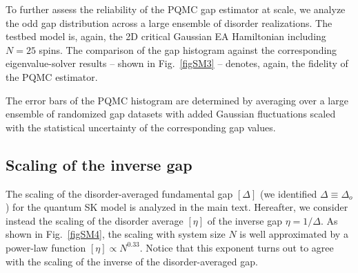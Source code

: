 \documentclass[aps,prl,twocolumn,superscriptaddress,nofootinbib]{revtex4-2}
\begin{document}
To further assess the reliability of the PQMC gap estimator at scale, we analyze the odd gap distribution across a large ensemble of disorder realizations. The testbed model is, again, the 2D critical Gaussian EA Hamiltonian including $N=25$ spins. The comparison of the gap histogram against the corresponding eigenvalue-solver results -- shown in Fig.~\ref{figSM3} -- denotes, again, the fidelity of the PQMC estimator.

The error bars of the PQMC histogram are determined by averaging over a large ensemble of randomized gap datasets with added Gaussian fluctuations scaled with the statistical uncertainty of the corresponding gap values.




\subsection{Scaling of the inverse gap}
The scaling of the disorder-averaged fundamental gap $[\Delta]$ (we identified $\Delta \equiv \Delta_o$) for the quantum SK model is analyzed in the main text. Hereafter, we consider instead the scaling of the disorder average $[\eta]$ of the inverse gap $\eta=1/\Delta$. As shown in Fig.~\ref{figSM4}, the scaling with system size $N$ is well approximated by a power-law function $[\eta]\propto N^{0.33}$.
Notice that this exponent turns out to agree with the scaling of the inverse of the disorder-averaged gap.
\end{document}

